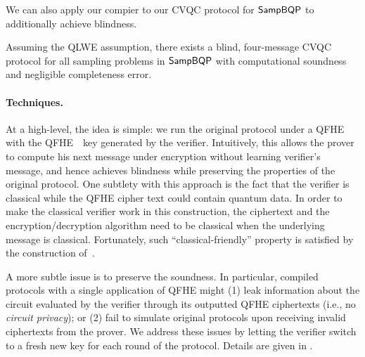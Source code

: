 We can also apply our compier to our CVQC protocol for $\operatorname{\mathsf{SampBQP}}$ to additionally achieve blindness. 

\begin{theorem}[informal]
        Assuming the QLWE assumption, there exists a blind, four-message CVQC protocol for all sampling problems in $\operatorname{\mathsf{SampBQP}}$ with  computational soundness and negligible completeness error.
\end{theorem}


\paragraph{Techniques.} At a high-level, the idea is simple: we run the original protocol under a QFHE with the QFHE　key generated by the verifier. Intuitively, this allows the prover to compute his next message under encryption without learning verifier's message, and hence achieves blindness while preserving the properties of the original protocol.
One subtlety with this approach is the fact that the verifier is classical while the QFHE cipher text could contain quantum data.
In order to make the classical verifier work in this construction, the ciphertext and the encryption/decryption algorithm need to be classical when the underlying message is classical. Fortunately, such  ``classical-friendly'' property is satisfied by the construction of~\cite{mahadev_qfhe}.

A more subtle issue is to preserve the soundness.
In particular, compiled protocols with a single application of QFHE might (1) leak information about the circuit evaluated by the verifier through its outputted QFHE ciphertexts (i.e., no \emph{circuit privacy});
or (2) fail to simulate original protocols upon receiving invalid ciphertexts from the prover.
We address these issues by letting the verifier switch to a fresh new key for each round of the protocol. 
Details are given in .



\iffalse

